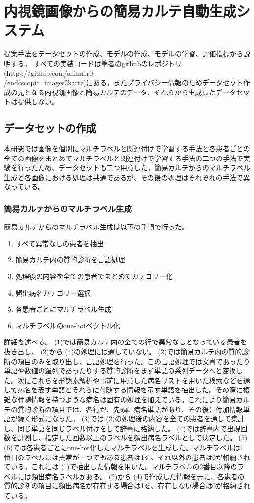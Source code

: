 \section{内視鏡画像からの簡易カルテ自動生成システム}
提案手法をデータセットの作成、モデルの作成、モデルの学習、評価指標から説明する。
すべての実装コードは筆者のgithubのレポジトリ (https://github.com/shinn1r0\\/endoscopic\_images2karte)にある。またプライバシー情報のためデータセット作成の元となる内視鏡画像と簡易カルテのデータ、それらから生成したデータセットは提供しない。
\subsection{データセットの作成}
本研究では画像を個別にマルチラベルと関連付けで学習する手法と各患者ごとの全ての画像をまとめてマルチラベルと関連付けで学習する手法の二つの手法で実験を行ったため、データセットも二つ用意した。簡易カルテからのマルチラベル生成と各画像における処理は共通であるが、その後の処理はそれぞれの手法で異なっている。
\subsubsection{簡易カルテからのマルチラベル生成}
簡易カルテからのマルチラベル生成は以下の手順で行った。
\begin{enumerate}
    \item すべて異常なしの患者を抽出
    \item 簡易カルテ内の質的診断を言語処理
    \item 処理後の内容を全ての患者でまとめてカテゴリー化
    \item 頻出病名カテゴリー選択
    \item 各患者ごとにマルチラベル生成
    \item マルチラベルのone-hotベクトル化
\end{enumerate}
詳細を述べる。 (1)では簡易カルテ内の全ての行で異常なしとなっている患者を抜き出し、 (2)から (4)の処理には通していない。 (2)では簡易カルテ内の質的診断の項目のみを取り出し、言語処理を行った。この言語処理では文書であったり単語や数値の羅列であったりする質的診断をまず単語の系列データへと変換した。次にこれらを形態素解析や事前に用意した病名リストを用いた検索などを通して病名を表す単語とそれらに付随する情報を示す単語を抽出した。その際に複雑な付随情報を持つような病名は固有の処理を加えている。これにより簡易カルテの質的診断の項目では、各行が、先頭に病名単語があり、その後に付加情報単語が続く形式になった。 (3)では (2)の処理後の内容を全ての患者を通して集計し、同じ単語を同じラベル付けをして辞書に格納した。 (4)では辞書内で出現回数を計測し、指定した回数以上のラベルを頻出病名ラベルとして決定した。 (5) (6)では各患者ごとにone-hot化したマルチラベルを生成した。マルチラベルは1番目のラベルには異常が一つでもある患者は1を、それ以外の患者は0が格納されている。これには (1)で抽出した情報を用いた。マルチラベルの2番目以降のラベルには頻出病名ラベルがある。 (2)から (4)で作成した情報を元に、各患者の質的診断の項目に頻出病名が存在する場合は1を、存在しない場合は0が格納されている。
